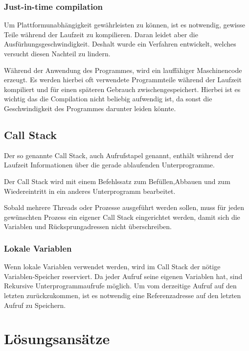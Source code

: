 \subsubsection{Just-in-time compilation}
Um Plattformunabhängigkeit gewährleisten zu können, ist es notwendig, gewisse Teile während der Laufzeit zu kompilieren. 
Daran leidet aber die Ausfürhungsgeschwindigkeit.  Deshalt wurde ein Verfahren entwickelt, welches versucht
diesen Nachteil zu lindern.

Während der Anwendung des Programmes, wird ein lauffähiger Maschinencode erzeugt. Es werden hierbei oft verwendete Programmteile
während der Laufzeit kompiliert und für einen späteren Gebrauch zwischengespeichert. Hierbei ist es wichtig das die Compilation nicht
beliebig aufwendig ist, da sonst die Geschwindigkeit des Programmes darunter leiden könnte.


\subsection{Call Stack}
Der so genannte Call Stack, auch Aufrufstapel genannt, enthält während der Laufzeit
Informationen über die gerade ablaufenden Unterprogramme. 

Der Call Stack wird mit einem Befehlssatz zum Befüllen,Abbauen und zum Wiedereintritt in ein anderes Unterprogramm bearbeitet.

Sobald mehrere Threads oder Prozesse ausgeführt werden sollen, muss für jeden gewünschten Prozess ein eigener Call Stack eingerichtet
werden, damit sich die Variablen und Rücksprungadressen nicht überschreiben.

\subsubsection{Lokale Variablen}
Wenn lokale Variablen verwendet werden, wird im Call Stack der nötige Variablen-Speicher reserviert. Da jeder Aufruf seine
eigenen Variablen hat, sind Rekursive Unterprogrammaufrufe möglich. Um vom derzeitige Aufruf auf den letzten zurückzukommen, ist
es notwendig eine Referenzadresse auf den letzten Aufruf zu Speichern.


\section{Lösungsansätze}
